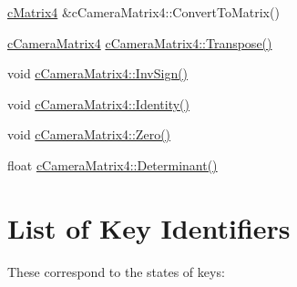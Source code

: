 \hyperlink{classc_matrix4}{cMatrix4} \&cCameraMatrix4::ConvertToMatrix() \par
 \hyperlink{classc_camera_matrix4}{cCameraMatrix4} \hyperlink{classc_camera_matrix4_ac1fa4dd9add669a8faecd0ca79713278}{cCameraMatrix4::Transpose()} \par
 void \hyperlink{classc_camera_matrix4_a97d111c444dd87ecec278e585fe058a7}{cCameraMatrix4::InvSign()} \par
 void \hyperlink{classc_camera_matrix4_a23a05c1aff8a58dc662f5b871b422c17}{cCameraMatrix4::Identity()} \par
 void \hyperlink{classc_camera_matrix4_a1ec81a7ec3274f89d2b8fb94923345c0}{cCameraMatrix4::Zero()} \par
 float \hyperlink{classc_camera_matrix4_a4f3456fc67fbd37692a8daa9d11d5fc6}{cCameraMatrix4::Determinant()} \par
\hypertarget{_reference_lists_KeyIdentifiersList}{}\section{List of Key Identifiers}\label{_reference_lists_KeyIdentifiersList}
These correspond to the states of keys:

